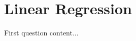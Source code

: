\documentclass{article}
\begin{document}
\section{Linear Regression}
First question content...
\end{document}

